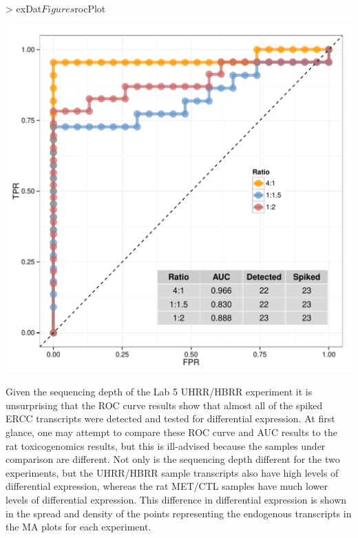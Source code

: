 \documentclass{article}
\begin{document}
\clearpage
\begin{center}
\begin{Schunk}
\begin{Sinput}
> exDat$Figures$rocPlot
\end{Sinput}
\end{Schunk}
\includegraphics{erccdashboardVignette-seqcCountPlotB}
\end{center}

Given the sequencing depth of the Lab 5 UHRR/HBRR experiment it is unsurprising that 
the ROC curve results show that almost all of the spiked ERCC transcripts were 
detected and tested for differential expression. At first glance, one may attempt
to compare these ROC curve and AUC results to the rat toxicogenomics results, but
this is ill-advised because the samples under comparison are different. Not only
is the sequencing depth different for the two experiments, but the UHRR/HBRR 
sample transcripts also have high levels of differential expression, whereas 
the rat MET/CTL samples have much lower levels of differential expression. This
difference in differential expression is shown in the spread and density of the 
points representing the endogenous transcripts in the MA plots for each experiment.
 
\end{document}
